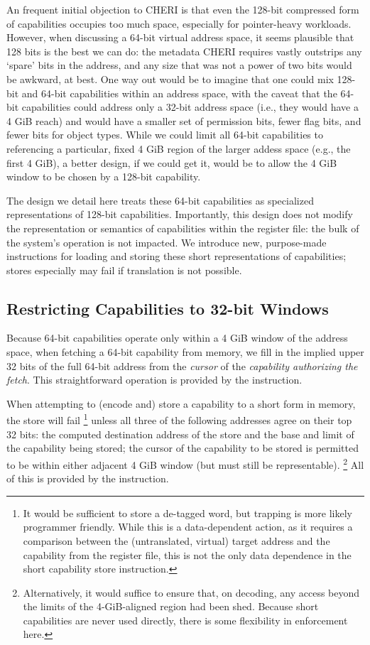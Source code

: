 An frequent initial objection to CHERI is that even the 128-bit compressed
form of capabilities occupies too much space, especially for pointer-heavy
workloads.  However, when discussing a 64-bit virtual address space, it
seems plausible that 128 bits is the best we can do: the metadata CHERI
requires vastly outstrips any `spare' bits in the address, and any size
that was not a power of two bits would be awkward, at best.  One way out
would be to imagine that one could mix 128-bit and 64-bit capabilities
within an address space, with the caveat that the 64-bit capabilities could
address only a 32-bit address space (i.e., they would have a 4 GiB reach)
and would have a smaller set of permission bits, fewer flag bits, and fewer
bits for object types.  While we could limit all 64-bit capabilities to
referencing a particular, fixed 4 GiB region of the larger addess space
(e.g., the first 4 GiB), a better design, if we could get it, would be to
allow the 4 GiB window to be chosen by a 128-bit capability.

The design we detail here treats these 64-bit capabilities as specialized
representations of 128-bit capabilities.  Importantly, this design does not
modify the representation or semantics of capabilities within the register
file: the bulk of the system's operation is not impacted.  We introduce new,
purpose-made instructions for loading and storing these short
representations of capabilities; stores especially may fail if translation
is not possible.

\subsection{Restricting Capabilities to 32-bit Windows} %

Because 64-bit capabilities operate only within a 4 GiB window of the
address space, when fetching a 64-bit capability from memory, we fill in the
implied upper 32 bits of the full 64-bit address from the \emph{cursor} of
the \emph{capability authorizing the fetch}.  This straightforward operation
is provided by the  instruction.

When attempting to (encode and) store a capability to a short form in memory,
the store will fail%
%
\footnote{It would be sufficient to store a de-tagged word, but trapping is
more likely programmer friendly.  While this is a data-dependent action, as it
requires a comparison between the (untranslated, virtual) target address and
the capability from the register file, this is not the only data dependence in
the short capability store instruction.}
%
unless all three of the following addresses agree on their top 32 bits: the
computed destination address of the store and the base and limit of the
capability being stored; the cursor of the capability to be stored is permitted
to be within either adjacent 4 GiB window (but must still be representable).%
%
\footnote{Alternatively, it would suffice to ensure that, on decoding, any
access beyond the limits of the 4-GiB-aligned region had been shed.  Because
short capabilities are never used directly, there is some flexibility in
enforcement here.}
%
All of this is provided by the  instruction.

